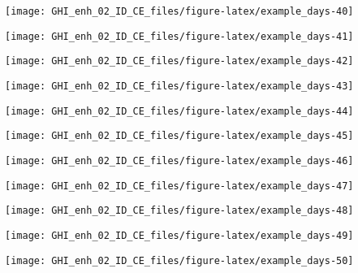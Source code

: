 \documentclass[
  10pt,
  a4paper,oneside]{article}
\begin{document}
\begin{center}\texttt{[image: GHI\_enh\_02\_ID\_CE\_files/figure-latex/example\_days-40]} \end{center}

\begin{center}\texttt{[image: GHI\_enh\_02\_ID\_CE\_files/figure-latex/example\_days-41]} \end{center}

\begin{center}\texttt{[image: GHI\_enh\_02\_ID\_CE\_files/figure-latex/example\_days-42]} \end{center}

\begin{center}\texttt{[image: GHI\_enh\_02\_ID\_CE\_files/figure-latex/example\_days-43]} \end{center}

\begin{center}\texttt{[image: GHI\_enh\_02\_ID\_CE\_files/figure-latex/example\_days-44]} \end{center}

\begin{center}\texttt{[image: GHI\_enh\_02\_ID\_CE\_files/figure-latex/example\_days-45]} \end{center}

\begin{center}\texttt{[image: GHI\_enh\_02\_ID\_CE\_files/figure-latex/example\_days-46]} \end{center}

\begin{center}\texttt{[image: GHI\_enh\_02\_ID\_CE\_files/figure-latex/example\_days-47]} \end{center}

\begin{center}\texttt{[image: GHI\_enh\_02\_ID\_CE\_files/figure-latex/example\_days-48]} \end{center}

\begin{center}\texttt{[image: GHI\_enh\_02\_ID\_CE\_files/figure-latex/example\_days-49]} \end{center}

\begin{center}\texttt{[image: GHI\_enh\_02\_ID\_CE\_files/figure-latex/example\_days-50]} \end{center}
\end{document}
